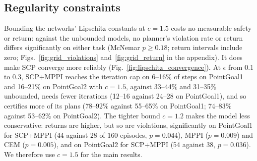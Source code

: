 \subsection{Regularity constraints}\label{sec:regularity_results}

Bounding the networks' Lipschitz constants at $c=1.5$ costs no measurable safety or return: against the unbounded
models, no planner's violation rate or return differs significantly on either task (McNemar $p\ge0.18$; return
intervals include zero;
Figs.~\ref{fig:grid_violations} and~\ref{fig:grid_return} in the appendix). It does make SCP converge more reliably
(Fig.~\ref{fig:lipschitz_convergence}). At $\epsilon$ from 0.1 to 0.3, SCP+MPPI reaches the iteration cap on 6--16\% of
steps on PointGoal1 and 16--21\% on PointGoal2 with $c=1.5$, against 33--44\% and 31--35\% unbounded, needs fewer
iterations (12--16 against 24--28 on PointGoal1), and so certifies more of its plans (78--92\% against 55--65\% on
PointGoal1; 74--83\% against 53--62\% on PointGoal2). The tighter bound $c=1.2$ makes the model less conservative:
returns are higher, but so are violations, significantly on PointGoal1 for SCP+MPPI (44 against 28 of 160 episodes,
$p=0.044$), MPPI ($p=0.009$) and CEM ($p=0.005$), and on PointGoal2 for SCP+MPPI (54 against 38, $p=0.036$). We
therefore use $c=1.5$ for the main results.
